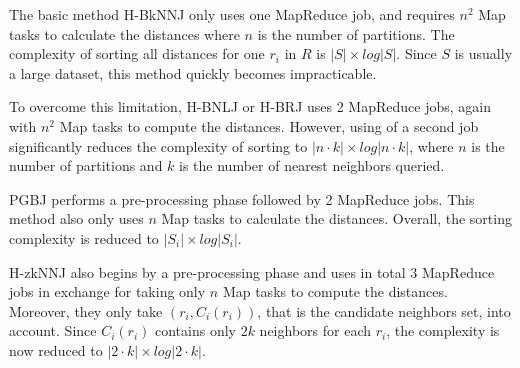 The basic method H-BkNNJ only uses one MapReduce job, and requires  
$n^2$ Map tasks to calculate the distances where $n$ is the number of 
partitions. The complexity of sorting all distances for one  $r_i$ in $R$ is $
\left|S\right| \times log\left|S\right|$. Since $S$ is usually a large 
dataset, this method quickly becomes impracticable.

To overcome this limitation, H-BNLJ or H-BRJ \cite{Zhang:2012:EPK:2247596.2247602} uses 2 MapReduce jobs, again 
with $n^2$ Map tasks to compute the distances. However, using of a second 
job significantly reduces the complexity of sorting  to $\left|n \cdot k
\right| \times log\left|n \cdot k\right|$, where $n$ is the number of 
partitions and $k$ is the number of nearest neighbors 
queried.

PGBJ\cite{Lu:2012:EPK:2336664.2336674} performs a pre-processing phase followed by 2 MapReduce jobs. This method also 
only uses $n$ Map tasks to calculate the distances. Overall, the sorting complexity is reduced to $\left|S_i\right| \times log\left|S_i\right|$. 

H-zkNNJ\cite{Zhang:2012:EPK:2247596.2247602} also begins by a pre-processing phase and uses in total 3 MapReduce jobs in 
exchange for taking only $n$ Map tasks to compute the distances. Moreover, they only take $
\left(r_i, C_i\left(r_i\right)\right)$, that is the candidate neighbors set, into account. Since $C_i\left(r_i\right)$ contains only $2k$ neighbors for each  
$r_i$, the complexity is now reduced to $\left|2 \cdot k\right| \times log\left|2 \cdot k\right|$.